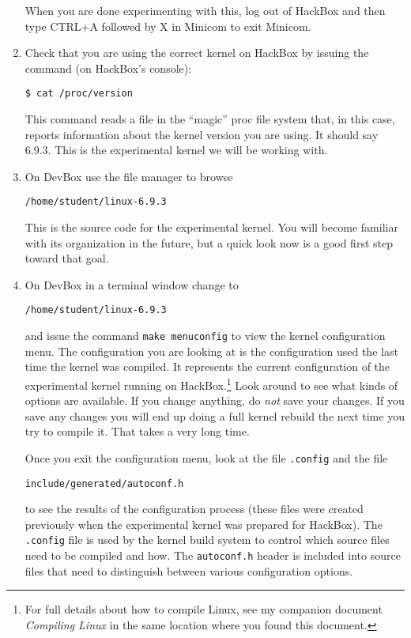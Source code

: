 \documentclass{article}
\newcommand{\command}[1]{\texttt{#1}}
\newcommand{\filename}[1]{\texttt{#1}}
\begin{document}
\begin{enumerate}
  When you are done experimenting with this, log out of HackBox and then type CTRL+A followed by
  X in Minicom to exit Minicom.

\item Check that you are using the correct kernel on HackBox by issuing the command (on
  HackBox's console):
\begin{Verbatim}
$ cat /proc/version
\end{Verbatim}
  This command reads a file in the ``magic'' proc file system that, in this case, reports
  information about the kernel version you are using. It should say 6.9.3. This is the
  experimental kernel we will be working with.

\item On DevBox use the file manager to browse
\begin{Verbatim}
/home/student/linux-6.9.3
\end{Verbatim}
  This is the source code for the experimental kernel. You will become familiar with its
  organization in the future, but a quick look now is a good first step toward that goal.

\item On DevBox in a terminal window change to
\begin{Verbatim}
/home/student/linux-6.9.3
\end{Verbatim}
  and issue the command \command{make menuconfig} to view the kernel configuration menu. The
  configuration you are looking at is the configuration used the last time the kernel was
  compiled. It represents the current configuration of the experimental kernel running on
  HackBox.\footnote{For full details about how to compile Linux, see my companion document
  \textit{Compiling Linux} in the same location where you found this document.} Look around to
  see what kinds of options are available. If you change anything, do \emph{not} save your
  changes. If you save any changes you will end up doing a full kernel rebuild the next time you
  try to compile it. That takes a very long time.

  Once you exit the configuration menu, look at the file \filename{.config} and the file
\begin{Verbatim}
include/generated/autoconf.h
\end{Verbatim}
  to see the results of the configuration process (these files were created previously when the
  experimental kernel was prepared for HackBox). The \filename{.config} file is used by the kernel
  build system to control which source files need to be compiled and how. The
  \filename{autoconf.h} header is included into source files that need to distinguish between
  various configuration options.
\end{enumerate}
\end{document}
